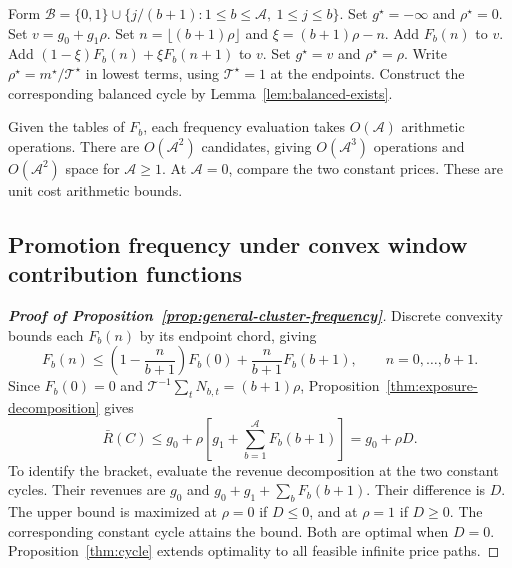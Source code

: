 \begin{algorithm}[htbp]
\caption{Balanced frequency search under concave window contribution functions}
\label{alg:general-balanced-frequency}
\begin{algorithmic}[1]
\STATE Form \(\mathcal B=\{0,1\}\cup\{j/(b+1):1\le b\le\mathcal A,\ 1\le j\le b\}\).
\STATE Set \(g^\star=-\infty\) and \(\rho^\star=0\).
\STATE Set \(v=g_0+g_1\rho\).
\STATE Set \(n=\lfloor(b+1)\rho\rfloor\) and \(\xi=(b+1)\rho-n\).
\STATE Add \(F_b(n)\) to \(v\).
\ELSE
\STATE Add \((1-\xi)F_b(n)+\xi F_b(n+1)\) to \(v\).
\ENDIF
\ENDFOR
{}
\STATE Set \(g^\star=v\) and \(\rho^\star=\rho\).
\ENDIF
\ENDFOR
\STATE Write \(\rho^\star=m^\star/\mathcal T^\star\) in lowest terms, using \(\mathcal T^\star=1\) at the endpoints.
\STATE Construct the corresponding balanced cycle by Lemma~\ref{lem:balanced-exists}.
\end{algorithmic}
\end{algorithm}
Given the tables of \(F_b\), each frequency evaluation takes \(O(\mathcal A)\) arithmetic operations. There are \(O(\mathcal A^2)\) candidates, giving \(O(\mathcal A^3)\) operations and \(O(\mathcal A^2)\) space for \(\mathcal A\ge1\). At \(\mathcal A=0\), compare the two constant prices. These are unit cost arithmetic bounds.

\FloatBarrier

\subsection{Promotion frequency under convex window contribution functions}
\label{app:constant-price-proof}
\begin{proof}[\normalfont\bfseries Proof of Proposition~\ref{prop:general-cluster-frequency}]
Discrete convexity bounds each \(F_b(n)\) by its endpoint chord, giving
\[
 F_b(n)\le\left(1-\frac n{b+1}\right)F_b(0)
 +\frac n{b+1}F_b(b+1),\qquad n=0,\ldots,b+1.
\]
Since \(F_b(0)=0\) and \(\mathcal T^{-1}\sum_tN_{b,t}=(b+1)\rho\), Proposition~\ref{thm:exposure-decomposition} gives
\[
 \bar R(C)\le g_0+\rho\left[g_1+\sum_{b=1}^{\mathcal A}F_b(b+1)\right]
 =g_0+\rho D.
\]
To identify the bracket, evaluate the revenue decomposition at the two constant cycles. Their revenues are \(g_0\) and \(g_0+g_1+\sum_bF_b(b+1)\). Their difference is \(D\). The upper bound is maximized at \(\rho=0\) if \(D\le0\), and at \(\rho=1\) if \(D\ge0\). The corresponding constant cycle attains the bound. Both are optimal when \(D=0\). Proposition~\ref{thm:cycle} extends optimality to all feasible infinite price paths.
\end{proof}

